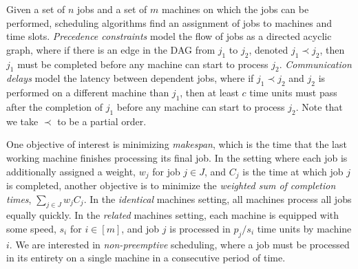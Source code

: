 


Given a set of $n$ jobs and a set of $m$ machines on which the jobs can be performed, 
scheduling algorithms find an assignment of jobs to machines and time slots.
\emph{Precedence constraints} model the flow of jobs as a directed acyclic graph, where 
 if there is an edge in the DAG from $j_1$ to $j_2$, denoted $j_1 \prec j_2$, then $j_1$ must be completed before any machine can start to process $j_2$.
\emph{Communication delays} model the latency between dependent jobs, 
where if $j_1 \prec j_2$ and $j_2$ is performed on a different machine than $j_1$, then at least $c$ time 
units must pass after the completion of $j_1$ before any machine can start to process $j_2$.
Note that we take $\prec$ to be a partial order.

One objective of interest is minimizing \emph{makespan}, which is the time that the last working machine finishes processing its final job.
In the setting where each job is additionally assigned a weight, $w_j$ for job $j \in J$, and $C_j$ is the time at which job $j$ is completed,
another objective is to minimize the \emph{weighted sum of completion times}, $\sum_{j \in J} w_j C_j$.
In the \emph{identical} machines setting, all machines process all jobs equally quickly.
In the \emph{related} machines setting, each machine is equipped with some speed, 
$s_i$ for $i \in [m]$, and job $j$ is processed in $p_j/s_i$ time units by machine $i$.
We are interested in \emph{non-preemptive} scheduling, where a job must be processed in its entirety on a single machine in a consecutive period of time.



